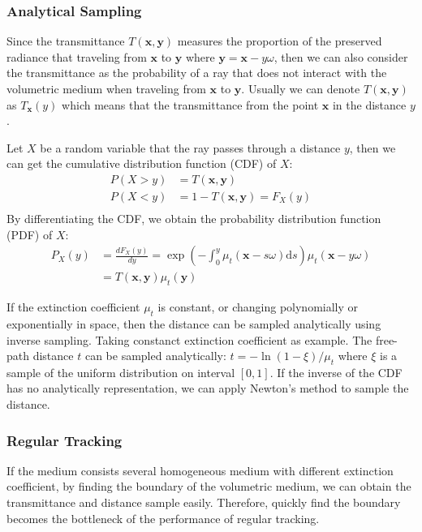 \documentclass[acmtog]{acmart}
\begin{document}
\subsubsection{Analytical Sampling}
Since the transmittance $T(\mathbf x, \mathbf y)$ measures the proportion of the preserved radiance that traveling from $\mathbf x$ to $\mathbf y$ where $\mathbf y=\mathbf x-y\omega$, then we can also consider the transmittance as the probability of a ray that does not interact with the volumetric medium when traveling from $\mathbf x$ to $\mathbf y$.
Usually we can denote $T(\mathbf x, \mathbf y)$ as $T_{\mathbf x}(y)$ which means that the transmittance from the point $\mathbf x$ in the distance $y$.

Let $X$ be a random variable that the ray passes through a distance $y$, then we can get the cumulative distribution function (CDF) of $X$:
\begin{equation}
	\begin{aligned}
		P(X>y)&=T(\mathbf x, \mathbf y)\\
		P(X<y)&=1-T(\mathbf x, \mathbf y)=F_X(y)\\
	\end{aligned}
\end{equation}
By differentiating the CDF, we obtain the probability distribution function (PDF) of $X$:
\begin{equation}
	\begin{aligned}
		P_X(y)&=\frac{dF_X(y)}{dy}=\exp\left(-\int_0^y\mu_t(\mathbf x-s\omega)\mathrm ds\right)\mu_t(\mathbf x-y\omega)\\
		&=T(\mathbf x, \mathbf y)\mu_t(\mathbf y)
	\end{aligned}
\end{equation}

If the extinction coefficient $\mu_t$ is constant, or changing polynomially or exponentially in space, then the distance can be sampled analytically using inverse sampling.
Taking constanct extinction coefficient as example. 
The free-path distance $t$ can be sampled analytically: $t=-\ln(1-\xi)/\mu_t$ where $\xi$ is a sample of the uniform distribution on interval $[0,1]$.
If the inverse of the CDF has no analytically representation, we can apply Newton's method to sample the distance.

\subsubsection{Regular Tracking}
If the medium consists several homogeneous medium with different extinction coefficient, by finding the boundary of the volumetric medium, we can obtain the transmittance and distance sample easily.
Therefore, quickly find the boundary becomes the bottleneck of the performance of regular tracking.
\end{document}
